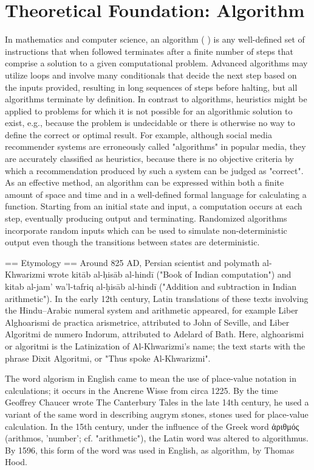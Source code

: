\documentclass[12pt,a4paper]{report}
\begin{document}
\section{Theoretical Foundation: Algorithm}
In mathematics and computer science, an algorithm ( ) is any well-defined set of instructions that when followed terminates after a finite number of steps that comprise a solution to a given computational problem. Advanced algorithms may utilize loops and involve many conditionals that decide the next step based on the inputs provided, resulting in long sequences of steps before halting, but all algorithms terminate by definition.
In contrast to algorithms, heuristics might be applied to problems for which it is not possible for an algorithmic solution to exist, e.g., because the problem is undecidable or there is otherwise no way to define the correct or optimal result. For example, although social media recommender systems are erroneously called "algorithms" in popular media, they are accurately classified as heuristics, because there is no objective criteria by which a recommendation produced by such a system can be judged as "correct".
As an effective method, an algorithm can be expressed within both a finite amount of space and time and in a well-defined formal language for calculating a function. Starting from an initial state and input, a computation occurs at each step, eventually producing output and terminating.  Randomized algorithms incorporate random inputs which can be used to simulate non-deterministic output even though the transitions between states are deterministic.


== Etymology ==
Around 825 AD, Persian scientist and polymath al-Khwarizmi wrote kitāb al-ḥisāb al-hindī ("Book of Indian computation") and kitab al-jam' wa'l-tafriq al-ḥisāb al-hindī ("Addition and subtraction in Indian arithmetic"). In the early 12th century, Latin translations of these texts involving the Hindu–Arabic numeral system and arithmetic appeared, for example Liber Alghoarismi de practica arismetrice, attributed to John of Seville, and Liber Algoritmi de numero Indorum, attributed to Adelard of Bath. Here, alghoarismi or algoritmi is the Latinization of Al-Khwarizmi's name; the text starts with the phrase Dixit Algoritmi, or "Thus spoke Al-Khwarizmi".

 
The word algorism in English came to mean the use of place-value notation in calculations; it occurs in the Ancrene Wisse from circa 1225. By the time Geoffrey Chaucer wrote The Canterbury Tales in the late 14th century, he used a variant of the same word in describing augrym stones, stones used for place-value calculation. In the 15th century, under the influence of the Greek word ἀριθμός (arithmos, 'number'; cf. "arithmetic"), the Latin word was altered to algorithmus. By 1596, this form of the word was used in English, as algorithm, by Thomas Hood.
\end{document}
